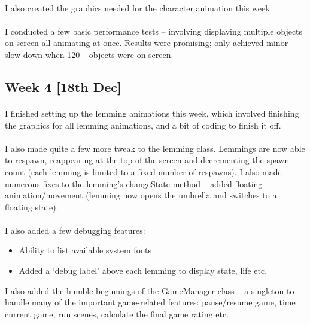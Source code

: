 \documentclass[a4paper,oneside]{report}
\begin{document}
\paragraph{} I also created the graphics needed for the character animation this week.

\paragraph{} I conducted a few basic performance tests – involving displaying multiple objects on-screen all animating at once. Results were promising; only achieved minor slow-down when 120+ objects were on-screen.



\subsection{Week 4 [18th Dec]}

\paragraph{} I finished setting up the lemming animations this week, which involved finishing the graphics for all lemming animations, and a bit of coding to finish it off.

\paragraph{} I also made quite a few more tweak to the lemming class. Lemmings are now able to respawn, reappearing at the top of the screen and decrementing the spawn count (each lemming is limited to a fixed number of respawns). I also made numerous fixes to the lemming’s changeState method – added floating animation/movement (lemming now opens the umbrella and switches to a floating state).

\paragraph{} I also added a few debugging features:
\begin{itemize}
	\item Ability to list available system fonts
	\item Added a ‘debug label’ above each lemming to display state, life etc.
\end{itemize}

I also added the humble beginnings of the GameManager class – a singleton to handle many of the important game-related features: pause/resume game, time current game, run scenes, calculate the final game rating etc.
\end{document}

